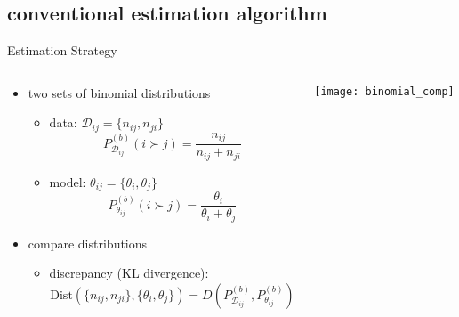 \documentclass[fleqn,aspectratio=1610]{beamer}
\begin{document}
\subsection{conventional estimation algorithm}
\label{sec:orgb892444}
\begin{frame}[label={sec:org1454c83}]{Estimation Strategy}
\begin{columns}
\begin{column}{0.5\columnwidth}
\begin{itemize}
\item two sets of binomial distributions
\begin{itemize}
\item data: \(\mathcal{D}_{ij}=\{n_{ij},n_{ji}\}\) 
\begin{equation}
  P^{(b)}_{\mathcal{D}_{ij}}(i\succ j)
  =\frac{n_{ij}}{n_{ij}+n_{ji}}
\end{equation}
\item model: \(\theta_{ij}=\{\theta_i,\theta_j\}\) 
\begin{equation}
  P^{(b)}_{\theta_{ij}}(i\succ j)
  =\frac{\theta_i}{\theta_i+\theta_j}
\end{equation}
\end{itemize}
\item compare distributions
\begin{itemize}
\item discrepancy (KL divergence):
\begin{equation}
  \mathrm{Dist}(\{n_{ij},n_{ji}\},\{\theta_i,\theta_j\})
  =D(P^{(b)}_{\mathcal{D}_{ij}},P^{(b)}_{\theta_{ij}})
\end{equation}
\end{itemize}
\end{itemize}
\end{column}
\begin{column}{0.5\columnwidth}
\begin{center}
\texttt{[image: binomial\_comp]}
\end{center}
\end{column}
\end{columns}
\end{frame}
\end{document}
